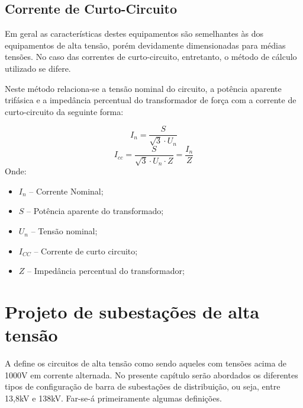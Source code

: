 	\section{Corrente de Curto-Circuito}
		Em geral as características destes equipamentos são semelhantes às dos equipamentos de alta tensão, porém devidamente dimensionadas para médias tensões. No caso das correntes de curto-circuito, entretanto, o método de cálculo utilizado se difere.\par
		Neste método relaciona-se a tensão nominal do circuito, a potência aparente trifásica e a impedância percentual do transformador de força com a corrente de curto-circuito da seguinte forma:\par
			\begin{equation} \label{eq:correntenominal}
			I_n = \frac{S}{\sqrt{3}\cdot U_n}
			\end{equation}
			\begin{equation} \label{eq:correntenominal}
			I_{cc} = \frac{S}{\sqrt{3}{\cdot}U_n{\cdot}Z} = \frac{I_n}{Z}
			\end{equation}
		Onde:\par

		\begin{itemize}		
		\item $I_n$ -- Corrente Nominal;
		\item $S$ -- Potência aparente do transformado;
		\item $U_n$ -- Tensão nominal;
		\item $I_{CC}$ -- Corrente de curto circuito;
		\item $Z$ -- Impedância percentual do transformador;
		\end{itemize}







\chapter{Projeto de subestações de alta tensão}
	\label{chap:projSEAT}
	A  define os circuitos de alta tensão como sendo aqueles com tensões acima de 1000V em corrente alternada. No presente capítulo serão abordados os diferentes tipos de configuração de barra de subestações de distribuição, ou seja, entre 13,8kV e 138kV. Far-se-á primeiramente algumas definições. 

